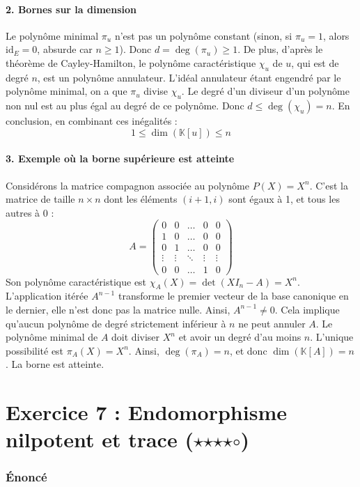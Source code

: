 \documentclass[11pt,a4paper]{article}
\begin{document}
\subsection{2. Bornes sur la dimension}
Le polynôme minimal $\pi_u$ n'est pas un polynôme constant (sinon, si $\pi_u = 1$, alors $\text{id}_E = 0$, absurde car $n \ge 1$). Donc $d = \deg(\pi_u) \ge 1$.
De plus, d'après le théorème de Cayley-Hamilton, le polynôme caractéristique $\chi_u$ de $u$, qui est de degré $n$, est un polynôme annulateur. L'idéal annulateur étant engendré par le polynôme minimal, on a que $\pi_u$ divise $\chi_u$.
Le degré d'un diviseur d'un polynôme non nul est au plus égal au degré de ce polynôme.
Donc $d \le \deg(\chi_u) = n$.
En conclusion, en combinant ces inégalités :
$$1 \le \dim(\mathbb{K}[u]) \le n$$

\subsection{3. Exemple où la borne supérieure est atteinte}
Considérons la matrice compagnon associée au polynôme $P(X) = X^n$. C'est la matrice de taille $n \times n$ dont les éléments $(i+1, i)$ sont égaux à 1, et tous les autres à 0 :
$$A = \begin{pmatrix} 0 & 0 & \dots & 0 & 0 \\ 1 & 0 & \dots & 0 & 0 \\ 0 & 1 & \dots & 0 & 0 \\ \vdots & \vdots & \ddots & \vdots & \vdots \\ 0 & 0 & \dots & 1 & 0 \end{pmatrix}$$
Son polynôme caractéristique est $\chi_A(X) = \det(X I_n - A) = X^n$.
L'application itérée $A^{n-1}$ transforme le premier vecteur de la base canonique en le dernier, elle n'est donc pas la matrice nulle. Ainsi, $A^{n-1} \neq 0$.
Cela implique qu'aucun polynôme de degré strictement inférieur à $n$ ne peut annuler $A$. Le polynôme minimal de $A$ doit diviser $X^n$ et avoir un degré d'au moins $n$. L'unique possibilité est $\pi_A(X) = X^n$.
Ainsi, $\deg(\pi_A) = n$, et donc $\dim(\mathbb{K}[A]) = n$. La borne est atteinte.




\part{Exercice 7 : Endomorphisme nilpotent et trace ($\star$$\star$$\star$$\star$$\circ$)}

\section{Énoncé}
\end{document}
